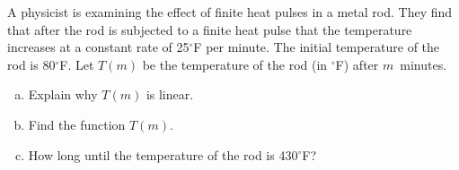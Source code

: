 \documentclass[12pt,letterpaper]{exam}
\begin{document}
\begin{questions}
\newpage
\question[15] A physicist is examining the effect of finite heat pulses in a metal rod. They find that after the rod is subjected to a finite heat pulse that the temperature increases at a constant rate of 25$^\circ$F per minute. The initial temperature of the rod is 80$^\circ$F. Let $T(m)$ be the temperature of the rod (in $^\circ$F) after $m$~minutes. 
	\begin{enumerate}[(a)]
	\item Explain why $T(m)$ is linear. \vfill
	\item Find the function $T(m)$. \vfill
	\item How long until the temperature of the rod is 430$^\circ$F? \vfill
	\end{enumerate}

\end{questions}
\end{document}

